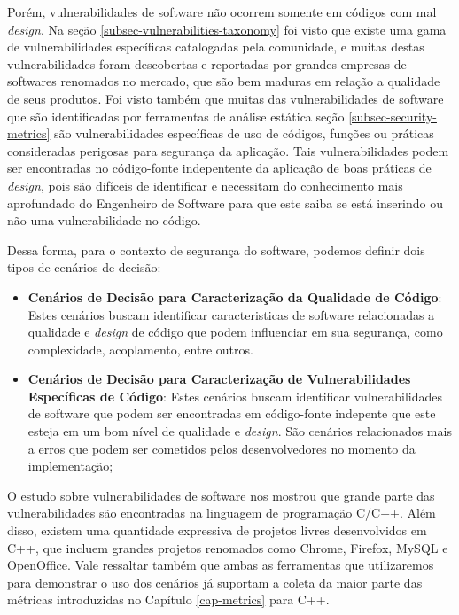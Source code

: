 Porém, vulnerabilidades de software não ocorrem somente em códigos com mal \emph{design}. Na seção \ref{subsec-vulnerabilities-taxonomy} foi visto que existe uma gama de vulnerabilidades específicas catalogadas pela comunidade, e muitas destas vulnerabilidades foram descobertas e reportadas por grandes empresas de softwares renomados no mercado, que são bem maduras em relação a qualidade de seus produtos. Foi visto também que muitas das vulnerabilidades de software que são identificadas por ferramentas de análise estática seção \ref{subsec-security-metrics} são vulnerabilidades específicas de uso de códigos, funções ou práticas consideradas perigosas para segurança da aplicação. Tais vulnerabilidades podem ser encontradas no código-fonte indepentente da aplicação de boas práticas de \emph{design}, pois são difíceis de identificar e necessitam do conhecimento mais aprofundado do Engenheiro de Software para que este saiba se está inserindo ou não uma vulnerabilidade no código.

Dessa forma, para o contexto de segurança do software, podemos definir dois tipos de cenários de decisão:

\begin{itemize}
\item \textbf{Cenários de Decisão para Caracterização da Qualidade de Código}: Estes cenários buscam identificar caracteristicas de software relacionadas a qualidade e \emph{design} de código que podem influenciar em sua segurança, como complexidade, acoplamento, entre outros.

\item \textbf{Cenários de Decisão para Caracterização de Vulnerabilidades Específicas de Código}: Estes cenários buscam identificar vulnerabilidades de software que podem ser encontradas em código-fonte indepente que este esteja em um bom nível de qualidade e \emph{design}. São cenários relacionados mais a erros que podem ser cometidos pelos desenvolvedores no momento da implementação;
\end{itemize}


O estudo sobre vulnerabilidades de software nos mostrou que grande parte das vulnerabilidades são encontradas na linguagem de programação C/C++. Além disso, existem uma quantidade expressiva de projetos livres desenvolvidos em C++, que incluem grandes projetos renomados como Chrome, Firefox, MySQL e OpenOffice. Vale ressaltar também que ambas as ferramentas que utilizaremos para demonstrar o uso dos cenários já suportam a coleta da maior parte das métricas introduzidas no Capítulo \ref{cap-metrics} para C++.

